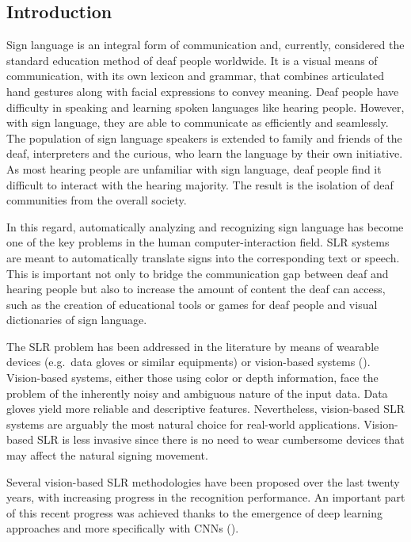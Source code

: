 \subsection{Introduction}
Sign language is an integral form of communication and, currently, considered the standard education method of deaf people worldwide. It is a visual means of communication, with its own lexicon and grammar, that combines articulated hand gestures along with facial expressions to convey meaning. Deaf people have difficulty in speaking and learning spoken languages like hearing people. However, with sign language, they are able to communicate as efficiently and seamlessly. The population of sign language speakers is extended to family and friends of the deaf, interpreters and the curious, who learn the language by their own initiative. As most hearing people are unfamiliar with sign language, deaf people find it difficult to interact with the hearing majority. The result is the isolation of deaf communities from the overall society.

In this regard, automatically analyzing and recognizing sign language has become one of the key problems in the human computer-interaction field. SLR systems are meant to automatically translate signs into the corresponding text or speech. This is important not only to bridge the communication gap between deaf and hearing people but also to increase the amount of content the deaf can access, such as the creation of educational tools or games for deaf people and visual dictionaries of sign language.

The SLR problem has been addressed in the literature by means of wearable devices (e.g.\ data gloves or similar equipments) or vision-based systems (\citet{Ahdal2012}). Vision-based systems, either those using color or depth information, face the problem of the inherently noisy and ambiguous nature of the input data. Data gloves yield more reliable and descriptive features. Nevertheless, vision-based SLR systems are arguably the most natural choice for real-world applications. Vision-based SLR is less invasive since there is no need to wear cumbersome devices that may affect the natural signing movement.

Several vision-based SLR methodologies have been proposed over the last twenty years, with increasing progress in the recognition performance. An important part of this recent progress was achieved thanks to the emergence of deep learning approaches and more specifically with CNNs (\citet{Pigou2015, Koller2016, Wu2016, Neverova2016, Kumar2017}).

